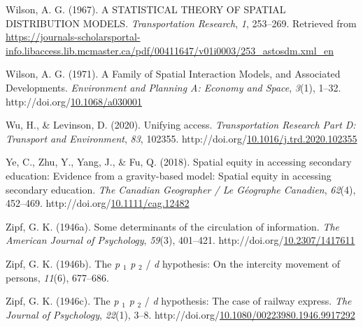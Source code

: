 \documentclass[
11pt, %
oneside, %
english, %
singlespacing, %
]{macthesis} %
\newlength{\cslhangindent}
\newenvironment{CSLReferences}[2] %
{\begin{list}{}{%
	\setlength{\itemindent}{0pt}
	\setlength{\leftmargin}{0pt}
	\setlength{\parsep}{0pt}
	\ifodd #1
	\setlength{\leftmargin}{\cslhangindent}
	\setlength{\itemindent}{-1\cslhangindent}
	\fi
	\setlength{\itemsep}{#2\baselineskip}}}
{\end{list}}
\begin{document}
\begin{CSLReferences}{1}{0}
Wilson, A. G. (1967). A {STATISTICAL} {THEORY} {OF} {SPATIAL} {DISTRIBUTION} {MODELS}. \emph{Transportation Research}, \emph{1}, 253--269. Retrieved from \url{https://journals-scholarsportal-info.libaccess.lib.mcmaster.ca/pdf/00411647/v01i0003/253_astosdm.xml_en}

Wilson, A. G. (1971). A Family of Spatial Interaction Models, and Associated Developments. \emph{Environment and Planning A: Economy and Space}, \emph{3}(1), 1--32. http://doi.org/\href{https://doi.org/10.1068/a030001}{10.1068/a030001}

Wu, H., \& Levinson, D. (2020). Unifying access. \emph{Transportation Research Part D: Transport and Environment}, \emph{83}, 102355. http://doi.org/\href{https://doi.org/10.1016/j.trd.2020.102355}{10.1016/j.trd.2020.102355}

Ye, C., Zhu, Y., Yang, J., \& Fu, Q. (2018). Spatial equity in accessing secondary education: {Evidence} from a gravity-based model: {Spatial} equity in accessing secondary education. \emph{The Canadian Geographer / Le Géographe Canadien}, \emph{62}(4), 452--469. http://doi.org/\href{https://doi.org/10.1111/cag.12482}{10.1111/cag.12482}

Zipf, G. K. (1946a). Some determinants of the circulation of information. \emph{The American Journal of Psychology}, \emph{59}(3), 401--421. http://doi.org/\href{https://doi.org/10.2307/1417611}{10.2307/1417611}

Zipf, G. K. (1946b). The \emph{p} \(_{\textrm{1}}\) \emph{p} \(_{\textrm{2}}\) / \emph{d} hypothesis: On the intercity movement of persons, \emph{11}(6), 677--686.

Zipf, G. K. (1946c). The \emph{p} \(_{\textrm{1}}\) \emph{p} \(_{\textrm{2}}\) / \emph{d} hypothesis: The case of railway express. \emph{The Journal of Psychology}, \emph{22}(1), 3--8. http://doi.org/\href{https://doi.org/10.1080/00223980.1946.9917292}{10.1080/00223980.1946.9917292}

\end{CSLReferences}
\end{document}
